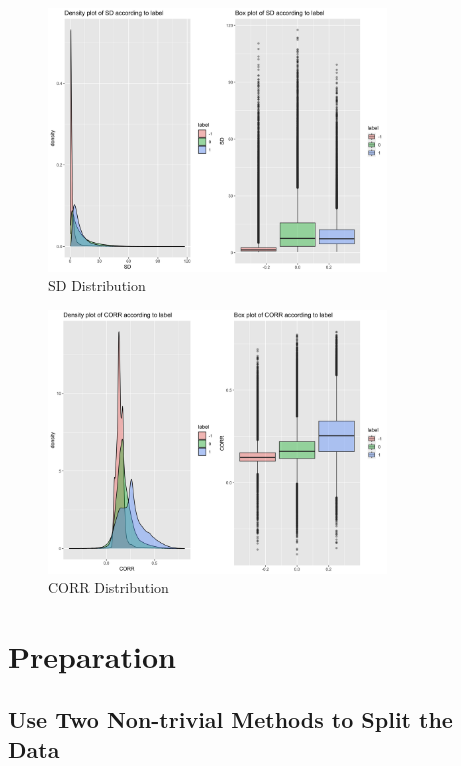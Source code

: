 \documentclass[11pt]{article}
\begin{document}
\begin{figure}[H]
  \centering
      \includegraphics[width=0.8\textwidth, height=0.5\textwidth]{../figures/SD_dis.png}
    \caption{SD Distribution}
  \end{figure}
  
 \begin{figure}[H]
  \centering 
      \includegraphics[width=0.8\textwidth, height=0.5\textwidth]{../figures/CORR_dis.png}
          \caption{CORR Distribution}
\end{figure}

\newpage
\section{Preparation}
\subsection{Use Two Non-trivial Methods to Split the Data} 
\end{document}
